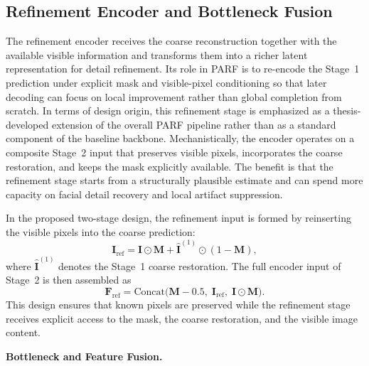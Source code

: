 \documentclass[12pt, twoside]{report}
\begin{document}
\subsection{Refinement Encoder and Bottleneck Fusion}

The refinement encoder receives the coarse reconstruction together with the available visible information and transforms them into a richer latent representation for detail refinement. Its role in PARF is to re-encode the Stage~1 prediction under explicit mask and visible-pixel conditioning so that later decoding can focus on local improvement rather than global completion from scratch. In terms of design origin, this refinement stage is emphasized as a thesis-developed extension of the overall PARF pipeline rather than as a standard component of the baseline backbone. Mechanistically, the encoder operates on a composite Stage~2 input that preserves visible pixels, incorporates the coarse restoration, and keeps the mask explicitly available. The benefit is that the refinement stage starts from a structurally plausible estimate and can spend more capacity on facial detail recovery and local artifact suppression.

In the proposed two-stage design, the refinement input is formed by reinserting the visible pixels into the coarse prediction:
\begin{equation}
\mathbf{I}_{\mathrm{ref}} = \mathbf{I} \odot \mathbf{M} + \hat{\mathbf{I}}^{(1)} \odot (1-\mathbf{M}),
\end{equation}
where $\hat{\mathbf{I}}^{(1)}$ denotes the Stage~1 coarse restoration. The full encoder input of Stage~2 is then assembled as
\begin{equation}
\mathbf{F}_{\mathrm{ref}} = \mathrm{Concat}\big(\mathbf{M} - 0.5,\; \mathbf{I}_{\mathrm{ref}},\; \mathbf{I}\odot\mathbf{M}\big).
\end{equation}
This design ensures that known pixels are preserved while the refinement stage receives explicit access to the mask, the coarse restoration, and the visible image content.

\vspace{0.35\baselineskip}
\noindent\textbf{Bottleneck and Feature Fusion.}\par
\end{document}
